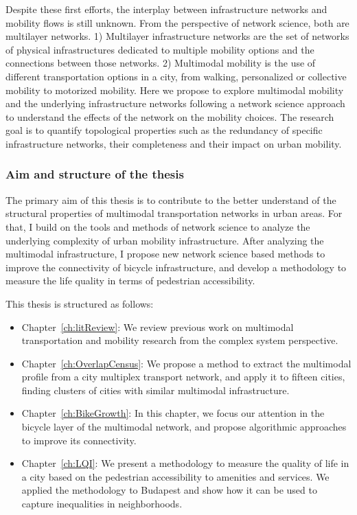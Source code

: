 Despite these first efforts, the interplay between infrastructure networks and mobility flows is still unknown. From the perspective of network science, both are multilayer networks. 1) Multilayer infrastructure networks are the set of networks of physical infrastructures dedicated to multiple mobility options and the connections between those networks. 2) Multimodal mobility is the use of different transportation options in a city, from walking, personalized or collective mobility to motorized mobility.
Here we propose to explore multimodal mobility and the underlying infrastructure networks following a network science approach to understand the effects of the network on the mobility choices. The research goal is to quantify topological properties such as the redundancy of specific infrastructure networks, their completeness and their impact on urban mobility. 

\subsubsection{Aim and structure of the thesis}
The primary aim of this thesis is to contribute to the better understand of the structural properties of multimodal transportation networks in urban areas. For that, I build on the tools and methods of network science to analyze the underlying complexity of urban mobility infrastructure. After analyzing the multimodal infrastructure, I propose new network science based methods to improve the connectivity of bicycle infrastructure, and develop a methodology to measure the life quality in terms of pedestrian accessibility.

This thesis is structured as follows:

\begin{itemize}
    \item Chapter~\ref{ch:litReview}: We review previous work on multimodal transportation and mobility research from the complex system perspective.
    \item Chapter~\ref{ch:OverlapCensus}: We propose a method to extract the multimodal profile from a city multiplex transport network, and apply it to fifteen cities, finding clusters of cities with similar multimodal infrastructure.
    \item Chapter~\ref{ch:BikeGrowth}: In this chapter, we focus our attention in the bicycle layer of the multimodal network, and propose algorithmic approaches to improve its connectivity.
    \item Chapter~\ref{ch:LQI}: We present a methodology to measure the quality of life in a city based on the pedestrian accessibility to amenities and services. We applied the methodology to Budapest and show how it can be used to capture inequalities in neighborhoods. 
\end{itemize}

